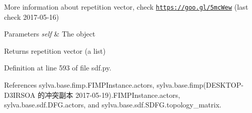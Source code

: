 More information about repetition vector, check \href{https://goo.gl/5mcWew}{\tt https\+://goo.\+gl/5mc\+Wew} (last check 2017-\/05-\/16)


\begin{DoxyParams}{Parameters}
{\em self} & The object\\
\hline
\end{DoxyParams}
\begin{DoxyReturn}{Returns}
repetition vector (a list) 
\end{DoxyReturn}


Definition at line 593 of file sdf.\+py.



References sylva.\+base.\+fimp.\+F\+I\+M\+P\+Instance.\+actors, sylva.\+base.\+fimp(\+D\+E\+S\+K\+T\+O\+P-\/\+D3\+I\+R\+S\+O\+A 的冲突副本 2017-\/05-\/19).\+F\+I\+M\+P\+Instance.\+actors, sylva.\+base.\+sdf.\+D\+F\+G.\+actors, and sylva.\+base.\+sdf.\+S\+D\+F\+G.\+topology\+\_\+matrix.


